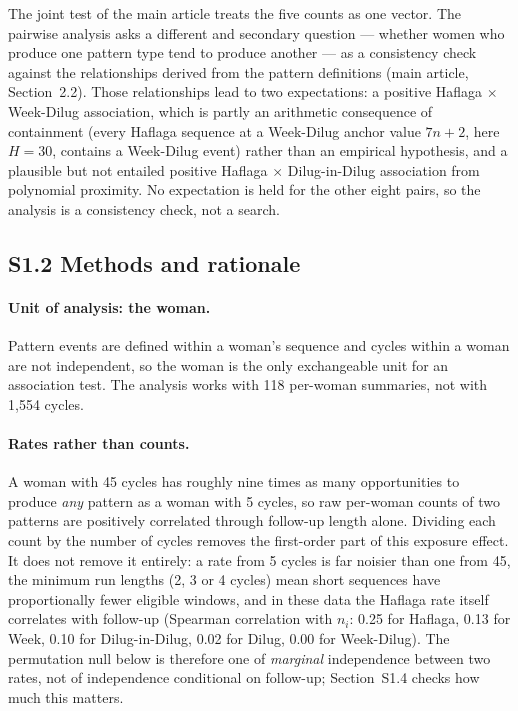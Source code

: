 \documentclass[12pt]{article}
\begin{document}
The joint test of the main article treats the five counts as one vector. The pairwise
analysis asks a different and secondary question --- whether women who produce one
pattern type tend to produce another --- as a consistency check against the relationships
derived from the pattern definitions (main article, Section~2.2). Those relationships
lead to two expectations: a positive Haflaga $\times$ Week-Dilug association, which is
partly an arithmetic consequence of containment (every Haflaga sequence at a Week-Dilug
anchor value $7n + 2$, here $H = 30$,
contains a Week-Dilug event) rather than an empirical hypothesis, and a plausible but not
entailed positive Haflaga $\times$ Dilug-in-Dilug association from polynomial proximity.
No expectation is held for the other eight pairs, so the analysis is a consistency check,
not a search.

\subsection*{S1.2 Methods and rationale}

\paragraph{Unit of analysis: the woman.} Pattern events are defined within a woman's
sequence and cycles within a woman are not independent, so the woman is the only
exchangeable unit for an association test. The analysis works with 118 per-woman
summaries, not with 1,554 cycles.

\paragraph{Rates rather than counts.} A woman with 45 cycles has roughly nine times as
many opportunities to produce \emph{any} pattern as a woman with 5 cycles, so raw
per-woman counts of two patterns are positively correlated through follow-up length
alone. Dividing each count by the number of cycles removes the first-order part of this
exposure effect. It does not remove it entirely: a rate from 5 cycles is far noisier than
one from 45, the minimum run lengths (2, 3 or 4 cycles) mean short sequences have
proportionally fewer eligible windows, and in these data the Haflaga rate itself
correlates with follow-up (Spearman correlation with $n_i$: 0.25 for Haflaga, 0.13 for
Week, 0.10 for Dilug-in-Dilug, 0.02 for Dilug, 0.00 for Week-Dilug). The permutation null
below is therefore one of \emph{marginal} independence between two rates, not of
independence conditional on follow-up; Section~S1.4 checks how much this matters.
\end{document}
